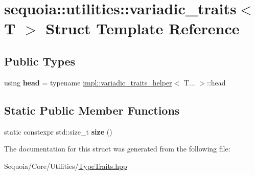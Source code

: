 \hypertarget{structsequoia_1_1utilities_1_1variadic__traits}{}\section{sequoia\+::utilities\+::variadic\+\_\+traits$<$ T $>$ Struct Template Reference}
\label{structsequoia_1_1utilities_1_1variadic__traits}
\subsection*{Public Types}
\begin{DoxyCompactItemize}
\item 
\mbox{\label{structsequoia_1_1utilities_1_1variadic__traits_ad8c7180e1f32fce1df326ed4145df205}} 
using {\bfseries head} = typename \mbox{\hyperlink{structsequoia_1_1utilities_1_1impl_1_1variadic__traits__helper}{impl\+::variadic\+\_\+traits\+\_\+helper}}$<$ T... $>$\+::head
\end{DoxyCompactItemize}
\subsection*{Static Public Member Functions}
\begin{DoxyCompactItemize}
\item 
\mbox{\label{structsequoia_1_1utilities_1_1variadic__traits_a9222f33147ff2444aa4ad3fc101110d9}} 
static constexpr std\+::size\+\_\+t {\bfseries size} ()
\end{DoxyCompactItemize}


The documentation for this struct was generated from the following file\+:\begin{DoxyCompactItemize}
\item 
Sequoia/\+Core/\+Utilities/\mbox{\hyperlink{_type_traits_8hpp}{Type\+Traits.\+hpp}}\end{DoxyCompactItemize}
